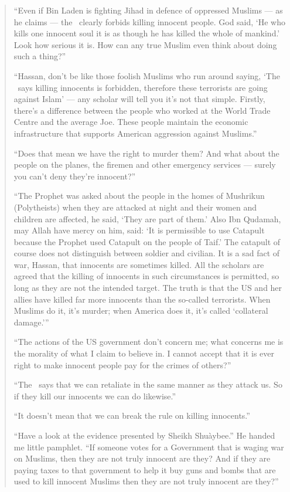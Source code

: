 \documentclass[12pt]{memoir}
\begin{document}
\begin{quote}
“Even if Bin Laden is fighting Jihad in defence of oppressed Muslims —
as he claims — the \Quran\ clearly forbids killing innocent people.
God said, ‘He who kills one innocent soul it is as though
he has killed the whole of mankind.’ Look how serious it is.
How can any true Muslim even think about doing such a thing?”

“Hassan, don’t be like those foolish Muslims who run around saying,
‘The \Quran\ says killing innocents is forbidden,
therefore these terrorists are going against Islam’ —
any scholar will tell you it’s not that simple.
Firstly, there’s a difference between the people
who worked at the World Trade Centre and the average Joe.
These people maintain the economic infrastructure
that supports American aggression against Muslims.”

“Does that mean we have the right to murder them?
And what about the people on the planes,
the firemen and other emergency services —
surely you can’t deny they’re innocent?”

“The Prophet was asked about the people in the homes of Mushrikun
(Polytheists) when they are attacked at night and their women
and children are affected, he said,
‘They are part of them.’
Also Ibn Qudamah, may Allah have mercy on him, said:
‘It is permissible to use Catapult because the Prophet
used Catapult on the people of Ta\´if.’
The catapult of course does not distinguish between soldier and civilian.
It is a sad fact of war, Hassan, that innocents are sometimes killed.
All the scholars are agreed that the killing of innocents
in such circumstances is permitted,
so long as they are not the intended target.
The truth is that the US and her allies have killed
far more innocents than the so-called terrorists.
When Muslims do it, it’s murder; when America does it,
it’s called ‘collateral damage.’”

“The actions of the US government don’t concern me;
what concerns me is the morality of what I claim to believe in.
I cannot accept that it is ever right to make innocent people pay
for the crimes of others?”

“The \Quran\ says that we can retaliate in the same manner as they attack us.
So if they kill our innocents we can do likewise.”

“It doesn’t mean that we can break the rule on killing innocents.”

“Have a look at the evidence presented by Sheikh Shu\`aybee.”
He handed me little pamphlet.
“If someone votes for a Government that is waging war on Muslims,
then they are not truly innocent are they?
And if they are paying taxes to that government to help it
buy guns and bombs that are used to kill innocent Muslims
then they are not truly innocent are they?”


\end{quote}
\end{document}
